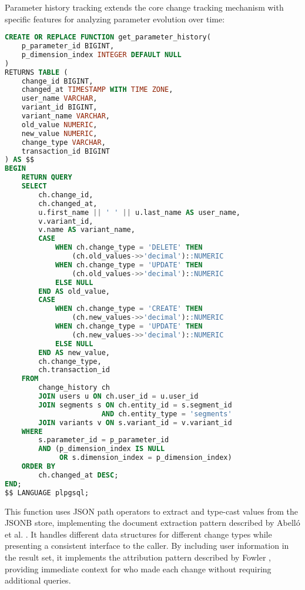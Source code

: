 Parameter history tracking extends the core change tracking mechanism with specific features for analyzing parameter evolution over time:

\begin{lstlisting}[language=SQL, caption={Parameter History Function Implementation}, label={lst:parameter-history-function}]
CREATE OR REPLACE FUNCTION get_parameter_history(
    p_parameter_id BIGINT,
    p_dimension_index INTEGER DEFAULT NULL
)
RETURNS TABLE (
    change_id BIGINT,
    changed_at TIMESTAMP WITH TIME ZONE,
    user_name VARCHAR,
    variant_id BIGINT,
    variant_name VARCHAR,
    old_value NUMERIC,
    new_value NUMERIC,
    change_type VARCHAR,
    transaction_id BIGINT
) AS $$
BEGIN
    RETURN QUERY
    SELECT 
        ch.change_id,
        ch.changed_at,
        u.first_name || ' ' || u.last_name AS user_name,
        v.variant_id,
        v.name AS variant_name,
        CASE
            WHEN ch.change_type = 'DELETE' THEN 
                (ch.old_values->>'decimal')::NUMERIC
            WHEN ch.change_type = 'UPDATE' THEN 
                (ch.old_values->>'decimal')::NUMERIC
            ELSE NULL
        END AS old_value,
        CASE
            WHEN ch.change_type = 'CREATE' THEN 
                (ch.new_values->>'decimal')::NUMERIC
            WHEN ch.change_type = 'UPDATE' THEN 
                (ch.new_values->>'decimal')::NUMERIC
            ELSE NULL
        END AS new_value,
        ch.change_type,
        ch.transaction_id
    FROM 
        change_history ch
        JOIN users u ON ch.user_id = u.user_id
        JOIN segments s ON ch.entity_id = s.segment_id 
                       AND ch.entity_type = 'segments'
        JOIN variants v ON s.variant_id = v.variant_id
    WHERE 
        s.parameter_id = p_parameter_id
        AND (p_dimension_index IS NULL 
             OR s.dimension_index = p_dimension_index)
    ORDER BY 
        ch.changed_at DESC;
END;
$$ LANGUAGE plpgsql;
\end{lstlisting}

This function uses JSON path operators to extract and type-cast values from the JSONB store, implementing the document extraction pattern described by Abelló et al. \cite{abello2006active}. It handles different data structures for different change types while presenting a consistent interface to the caller. By including user information in the result set, it implements the attribution pattern described by Fowler \cite{fowler2003patterns}, providing immediate context for who made each change without requiring additional queries.

